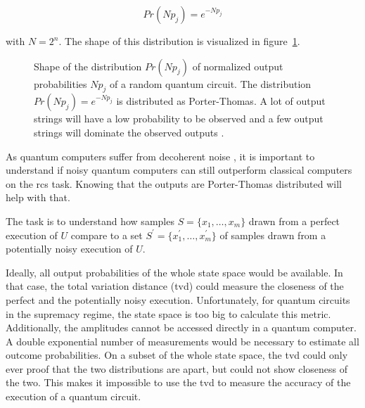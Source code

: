 \begin{equation}
  Pr(Np_j) = e^{-Np_j}
\end{equation}

with $N=2^n$. The shape of this distribution is visualized in figure~\ref{fig:porterthomas}.

\begin{figure}[H]
  \centering
  \caption[Output Distribution of Random Quantum Circuits]{Shape of the distribution $Pr(Np_j)$ of normalized output probabilities $Np_j$ of a
    random quantum circuit. The distribution $Pr(Np_j)=e^{-Np_j}$ is distributed as
    Porter-Thomas. A lot of output strings will have a low probability to be
    observed and a few output strings will dominate the observed outputs \cite{Boixo2018supremacy}.}
  \label{fig:porterthomas}
\end{figure}

As quantum computers suffer from decoherent noise \cite{Zeh:1970zz}, it is
important to understand if noisy quantum computers can still
outperform classical computers on the \gls{rcs} task. Knowing that the outputs are
Porter-Thomas distributed will help with that.

The task is to understand how samples $S=\{x_1,\dots,x_m\}$ drawn from a perfect execution of
$U$ compare to a set $S^{\prime}=\{x_1^{\prime},\dots,x_m^{\prime}\}$ of samples drawn from a potentially noisy
execution of $U$.

Ideally, all output probabilities of the whole state space would be available. In that case, 
the total variation distance (\gls{tvd}) could measure the closeness of the perfect and the potentially noisy 
execution. Unfortunately, for quantum circuits in the supremacy regime, the state space is too big 
to calculate this metric. Additionally, the amplitudes cannot be accessed directly in a quantum computer. 
A double exponential number of measurements would be necessary to estimate all outcome probabilities.
On a subset of the whole state space, the \gls{tvd} could only ever proof that the two distributions are apart, but 
could not show closeness of the two. 
This makes it impossible to use the \gls{tvd} to measure the accuracy of the execution of a quantum circuit.

